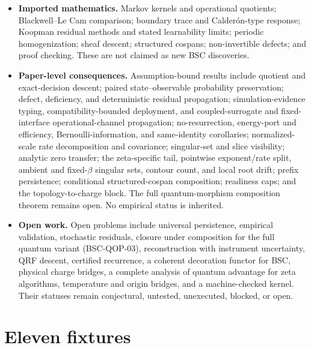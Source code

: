 \documentclass[10pt,a4paper,twocolumn]{extarticle}
\begin{document}
\begin{itemize}
\RaggedRight
\item \textbf{Imported mathematics.} Markov kernels and operational quotients;
Blackwell--Le Cam comparison; boundary trace and Calderón-type response;
Koopman residual methods and stated learnability limits; periodic
homogenization; sheaf descent; structured cospans; non-invertible defects; and
proof checking.  These are not claimed as new BSC discoveries.
\item \textbf{Paper-level consequences.} Assumption-bound results include
quotient and exact-decision descent; paired state--observable probability
preservation; defect, deficiency, and deterministic residual propagation;
simulation-evidence typing, compatibility-bounded deployment, and
coupled-surrogate and fixed-interface operational-channel propagation;
no-resurrection, energy-port and efficiency, Bernoulli-information, and
same-identity corollaries;
normalized-scale rate decomposition and covariance; singular-set and slice
visibility; analytic zero transfer; the zeta-specific tail, pointwise
exponent/rate split, ambient and fixed-\(\beta\) singular sets, contour count,
and local root drift; prefix persistence; conditional
structured-cospan composition; readiness caps; and the topology-to-charge
block.  The full quantum-morphism composition theorem remains open.  No
empirical status is inherited.
\item \textbf{Open work.} Open problems include universal persistence,
empirical validation, stochastic residuals, closure under composition for the
full quantum variant (BSC-QOP-03), reconstruction with instrument uncertainty,
QRF descent, certified recurrence, a coherent decoration functor for BSC,
physical charge bridges, a complete analysis of quantum advantage for zeta
algorithms, temperature and origin bridges, and a machine-checked kernel.
Their statuses remain conjectural, untested, unexecuted, blocked, or open.
\end{itemize}

\section*{Eleven fixtures}
\end{document}
